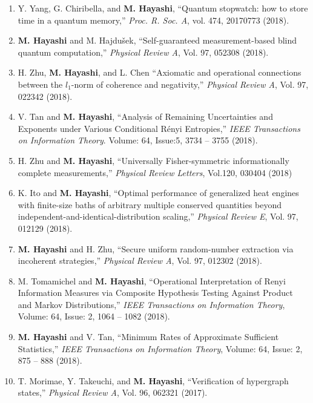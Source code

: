 \documentclass[a4paper,12pt,oneside]{article}
\begin{document}
\begin{enumerate}
\item 
Y. Yang, G. Chiribella, and
\textbf{M. Hayashi},
``Quantum stopwatch: how to store time in a quantum memory,''
{\em Proc. R. Soc. A}, vol. 474, 20170773 (2018).

\item 
\textbf{M. Hayashi} and M. Hajdu\v{s}ek,
``Self-guaranteed measurement-based blind quantum computation,'' 
{\em Physical Review A}, Vol. 97, 052308 (2018).

\item 
H. Zhu, \textbf{M. Hayashi}, and L. Chen
``Axiomatic and operational connections between the $l_1$-norm of coherence and negativity,''
{\em Physical Review A}, Vol. 97, 022342 (2018).

\item 
V. Tan and \textbf{M. Hayashi},
``Analysis of Remaining Uncertainties and Exponents under Various Conditional R\'{e}nyi Entropies,''
{\em IEEE Transactions on Information Theory}.
Volume: 64, Issue:5, 3734 -- 3755 (2018). 

\item 
H. Zhu and \textbf{M. Hayashi},
``Universally Fisher-symmetric informationally complete measurements,''
{\em Physical Review Letters}, Vol.120, 030404 (2018)

\item 
K. Ito and \textbf{M. Hayashi},
``Optimal performance of generalized heat engines with finite-size baths
of arbitrary multiple conserved quantities beyond independent-and-identical-distribution scaling,''
{\em Physical Review E}, Vol. 97, 012129 (2018).

\item 
\textbf{M. Hayashi} and H. Zhu,
``Secure uniform random-number extraction via incoherent strategies,''
{\em Physical Review A}, Vol. 97, 012302 (2018).

\item 
M. Tomamichel and \textbf{M. Hayashi}, 
``Operational Interpretation of Renyi Information Measures via Composite Hypothesis Testing Against Product and Markov Distributions,''
{\em IEEE Transactions on Information Theory},
Volume: 64, Issue: 2, 1064 -- 1082 (2018). 

\item 
\textbf{M. Hayashi} and V. Tan, 
``Minimum Rates of Approximate Sufficient Statistics,''
{\em IEEE Transactions on Information Theory},
Volume: 64, Issue: 2, 875 -- 888 (2018). 

\item 
T. Morimae, Y. Takeuchi, and \textbf{M. Hayashi},
``Verification of hypergraph states,''
{\em Physical Review A}, Vol. 96, 062321 (2017).


\end{enumerate}
\end{document}
